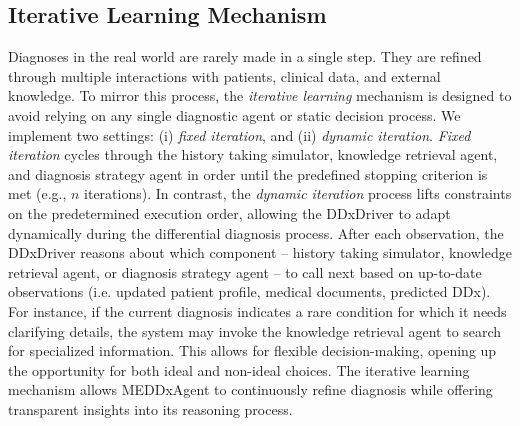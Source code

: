 \subsection{Iterative Learning Mechanism}
\label{subsec:iterative_learning}
Diagnoses in the real world are rarely made in a single step. They are refined through multiple interactions with patients, clinical data, and external knowledge. To mirror this process, the \textit{iterative learning} mechanism is designed to avoid relying on any single diagnostic agent or static decision process. We implement two settings: (i) \textit{fixed iteration}, and (ii) \textit{dynamic iteration}. \textit{Fixed iteration} cycles through the history taking simulator, knowledge retrieval agent, and diagnosis strategy agent in order until the predefined stopping criterion is met (e.g., $n$ iterations).
In contrast, the \textit{dynamic iteration} process lifts constraints on the predetermined execution order, allowing the DDxDriver to adapt dynamically during the differential diagnosis process. After each observation, the DDxDriver reasons about which component -- history taking simulator, knowledge retrieval agent, or diagnosis strategy agent -- to call next based on up-to-date observations (i.e. updated patient profile, medical documents, predicted DDx). For instance, if the current diagnosis indicates a rare condition for which it needs clarifying details, the system may invoke the knowledge retrieval agent to search for specialized information. This allows for flexible decision-making, opening up the opportunity for both ideal and non-ideal choices. The iterative learning mechanism allows MEDDxAgent to continuously refine diagnosis while offering transparent insights into its reasoning process.
\vspace{-0.5em}